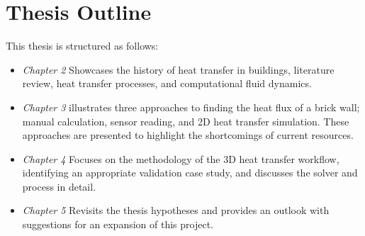 \section{Thesis Outline}
This thesis is structured as follows:
\begin{itemize}
    \item \textit{Chapter 2} Showcases the history of heat transfer in buildings, literature review, heat transfer processes, and computational fluid dynamics.
     \item \textit{Chapter 3} illustrates three approaches to finding the heat flux of a brick wall; manual calculation, sensor reading, and 2D heat transfer simulation. These approaches are presented to highlight the shortcomings of current resources. 
      \item \textit{Chapter 4} Focuses on the methodology of the 3D heat transfer workflow, identifying an appropriate validation case study, and discusses the solver and process in detail.
       \item \textit{Chapter 5} Revisits the thesis hypotheses and provides an outlook with suggestions for an expansion of this project.
\end{itemize}